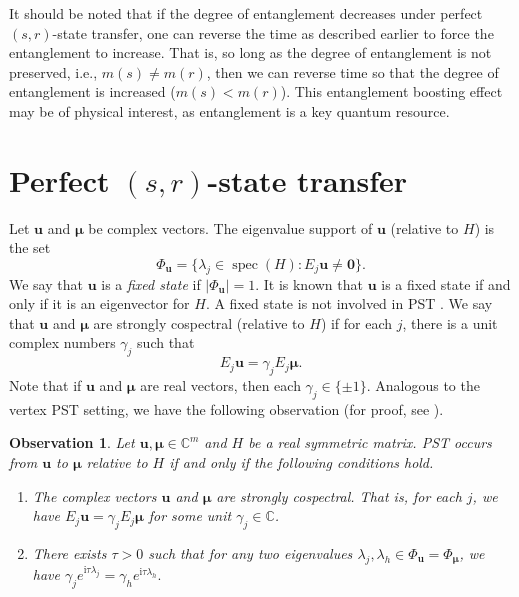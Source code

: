 \documentclass{article}
\numberwithin{equation}{section}
\newtheorem{observation}[lemma]{Observation}
\newcommand{\zero}{\mathbf 0}
\newcommand{\bu}{\mathbf u}
\newcommand{\bmu}{{\boldsymbol{\mu}}}
\newcommand{\supp}{{\Phi}}
\def\C{\mathbb{C}}
\def\ii{\mathrm{i}}
\begin{document}
{It should be noted that if the degree of entanglement decreases under perfect $(s,r)$-state transfer, one can reverse the time as described earlier to force the entanglement to increase. That is, so long as the degree of entanglement is not preserved, i.e., $m(s)\neq m(r)$, then we can reverse time so that the degree of entanglement is increased ($m(s) < m(r)$). This entanglement boosting effect may be of physical interest, as entanglement is a key quantum resource. 
\section{Perfect $(s, r)$-state transfer}\label{sec:sPST}

Let  $\bu$ and $\bmu$ be complex vectors. The eigenvalue support of $\bu$ (relative to $H$) is the set
\begin{equation*}
\supp_{\bu}=\{\lambda_j\in\operatorname{spec}(H):E_j\bu\neq \zero\}.
\end{equation*}
We say that $\bu$ is a \textit{fixed state} if $|\supp_{\bu}|=1$. It is known that $\bu$ is a fixed state if and only if it is an eigenvector for $H$. A fixed state is not involved in PST \cite{godsil2025perfect,monterde2025quantum}. We say that $\bu$ and $\bmu$ are strongly cospectral (relative to $H$) if for each $j$, there is a unit complex numbers $\gamma_j$ such that
\begin{equation*}
E_j\bu=\gamma_jE_j\bmu.
\end{equation*} 
Note that if $\bu$ and $\bmu$ are real vectors, then each $\gamma_j\in\{\pm 1\}$. Analogous to the vertex PST setting, we have the following observation (for proof, see \cite[Thm 4.1.3]{monterde2025quantum}). 

\begin{observation}
\label{Thm:charPST}
Let $\bu,\bmu\in \C^m$ and $H$ be a real symmetric matrix. PST occurs from $\bu$ to $\bmu$ relative to $H$ if and only if the following conditions hold.
\begin{enumerate}
\item The complex vectors $\bu$ and $\bmu$ are strongly cospectral. That is, for each $j$, we have $E_j\bu=\gamma_jE_j\bmu$ for some unit $\gamma_j\in\C$.
\item There exists $\tau>0$ such that for any two eigenvalues $\lambda_j,\lambda_h\in\supp_{\bu}=\supp_{\bmu}$, we have $\gamma_je^{\ii\tau\lambda_j}=\gamma_h e^{\ii\tau\lambda_h}.$
\end{enumerate}
\end{observation}

}
\end{document}
